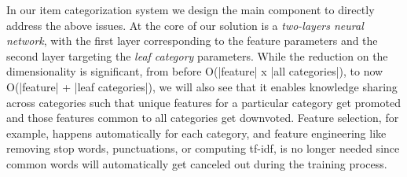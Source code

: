 In our item categorization system we design the main component to directly address the above issues. At the core of our solution is a \emph{two-layers neural network}, with the first layer corresponding to the feature parameters and the second layer targeting the \emph{leaf category} parameters. 
While the reduction on the dimensionality is significant, from before O(|feature| x |all categories|), to now O(|feature| + |leaf categories|), we will also see that it enables knowledge sharing across categories such that unique features for a particular category get promoted and those features common to all categories get downvoted. 
Feature selection, for example, happens automatically for each category, and feature engineering like removing stop words, punctuations, or computing tf-idf, is no longer needed since common words will automatically get canceled out during the training process. 









